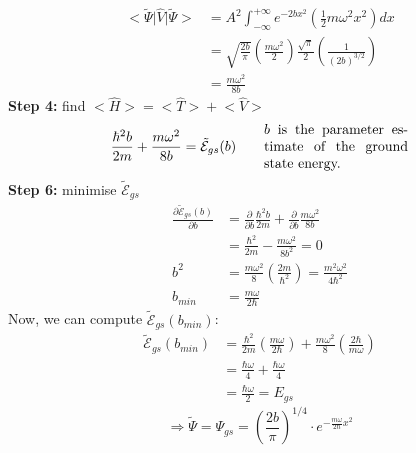 \documentclass[12pt,fancychapters]{report}
\numberwithin{equation}{section}
\begin{document}
\begin{align*}
  \big<\tilde{\Psi}\big|\hat{V}\big|\tilde{\Psi}\big> &= A^2\int_{-\infty}^{+\infty}
  e^{-2bx^2}\left(\frac{1}{2} m \omega^2x^2\right)dx\\
  &= \sqrt{\frac{2b}{\pi}}\left(\frac{m\omega^2}{2}\right)\frac{\sqrt{\pi}}{2}
  \left(\frac{1}{(2b)^{3/2}}\right)\\
  &= \frac{m\omega^2}{8b}
\end{align*}
\textbf{Step 4:} find $\big<\hat{H}\big> = \big<\hat{T}\big>+\big<\hat{V}\big>$
\[
  \frac{\hbar^2 b}{2m} + \frac{m\omega^2}{8b} = \tilde{\mathcal{E}}_{gs}(b)\qquad
  \parbox{0.3\textwidth}{$b$ is the parameter estimate of the ground state energy.}
\]
\textbf{Step 6:} minimise $\tilde{\mathcal{E}}_{gs}$
\begin{align*}
  \frac{\partial \tilde{\mathcal{E}}_{gs}(b)}{\partial b} &= \frac{\partial}{\partial b}
  \frac{\hbar^2 b}{2m} + \frac{\partial }{\partial b}\frac{m\omega^2}{8b}\\
  &= \frac{\hbar^2}{2m} - \frac{m\omega^2}{8b^2} = 0\\
  b^2 &= \frac{m\omega^2}{8}\left(\frac{2m}{\hbar^2}\right) = \frac{m^2\omega^2}{4\hbar^2}\\
  b_{min} &= \frac{m\omega}{2\hbar}
\end{align*}
Now, we can compute $\tilde{\mathcal{E}}_{gs}(b_{min})$:
\begin{align*}
  \tilde{\mathcal{E}}_{gs}(b_{min})&= \frac{\hbar^2}{2m}\left(\frac{m\omega}{2\hbar}\right)
  + \frac{m\omega^2}{8}\left(\frac{2\hbar}{m\omega}\right)\\
                                   &= \frac{\hbar\omega}{4}+\frac{\hbar\omega}{4}\\
                                   &= \frac{\hbar\omega}{2} = E_{gs}
\end{align*}
\[
  \Rightarrow \boxed{\tilde{\Psi} = \Psi_{gs} = \left(\frac{2b}{\pi}\right)^{1/4} 
  \cdot e^{-\frac{m\omega}{2\hbar}x^2}}
\]
\end{document}
